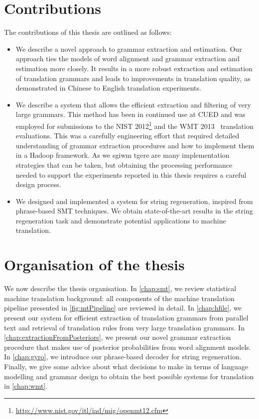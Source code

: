 \section{Contributions}

The contributions of this thesis are outlined as follows:
%
\begin{itemize}
  \item We describe a novel approach to grammar extraction
    and estimation. Our approach ties the models of word
    alignment and grammar extraction and estimation more
    closely. It results in a more robust extraction and estimation
    of translation grammars and leads to improvements in
    translation quality, as demonstrated in Chinese to English
    translation experiments.
  \item We describe a system that
    allows the efficient extraction
    and filtering of very large grammars.
    This method has been in continued use at
    CUED and was employed for submissions to
    the NIST 2012\footnote{\url{http://www.nist.gov/itl/iad/mig/openmt12.cfm}}
    and the WMT
    2013~\citep{bojar-buck-callisonburch-federmann-haddow-koehn-monz-post-soricut-specia:2013:WMT} translation
    evaluations. This was a carefully engineering effort
    that required detailed understanding of grammar
    extraction procedures and how to implement them in a
    Hadoop framework. As we sgiwm tgere are many implementation
    strategies that can be taken, but obtaining the processing
    performance needed to support the experiments
    reported in this thesis requires a careful design process.
  \item We designed and implemented a system
    for string regeneration, inspired from
    phrase-based SMT techniques. We obtain
    state-of-the-art results in the string
    regeneration task and demonstrate potential
    applications to machine translation.
\end{itemize}

\section{Organisation of the thesis}

We now describe the thesis organisation.
In \autoref{chap:smt}, we review statistical
machine translation background: all components
of the machine translation pipeline presented in \autoref{fig:mtPipeline}
are reviewed in detail.
In \autoref{chap:hfile}, we present our system for efficient
extraction of translation grammars from parallel
text and retrieval of translation rules
from very large translation grammars.
In \autoref{chap:extractionFromPosteriors}, we
present our novel grammar extraction procedure that makes use of
posterior probabilities from word alignment models.
In \autoref{chap:gyro}, we introduce our phrase-based decoder
for string regeneration. Finally, we give some advice
about what decisions to make in terms of language modelling
and grammar design to obtain the best possible systems
for translation in \autoref{chap:wmt}.
